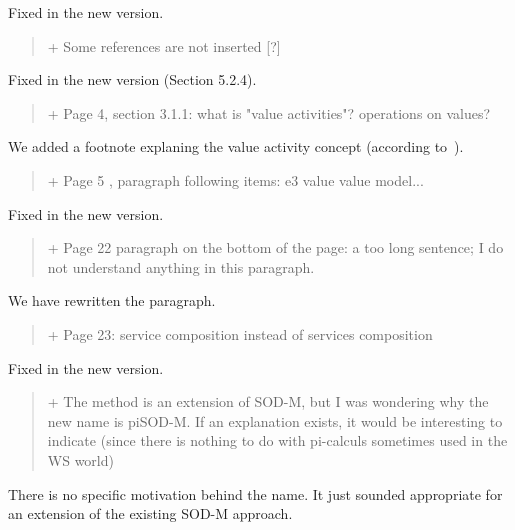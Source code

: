 \documentclass[12pt,a4wide]{article}
\begin{document}
\noindent 
Fixed in the new version.


\begin{quotation}\sf\footnotesize

+ Some references are not inserted [?] 
\end{quotation}

\noindent 
Fixed in the new version (Section 5.2.4).

\begin{quotation}\sf\footnotesize

+ Page 4, section 3.1.1: what is "value activities"? operations on values? 
\end{quotation}

\noindent 
We added a footnote explaning the value activity concept (according to~\cite{Gordijn02valuebased}).

\begin{quotation}\sf\footnotesize

+ Page 5 , paragraph following items: e3 value value model... 
\end{quotation}

\noindent 
Fixed in the new version.

\begin{quotation}\sf\footnotesize

+ Page 22 paragraph on the bottom of the page: a too long sentence; I do not understand anything in this paragraph. 
\end{quotation}

\noindent 
We have rewritten the paragraph.

\begin{quotation}\sf\footnotesize

+ Page 23: service composition instead of services composition 
\end{quotation}

\noindent 
Fixed in the new version.


\begin{quotation}\sf\footnotesize

+ The method is an extension of SOD-M, but I was wondering why the new name is piSOD-M. If an explanation exists, it would be interesting to indicate (since there is nothing to do with pi-calculs sometimes used in the WS world) 
\end{quotation}

\noindent 
There is no specific motivation behind the name. 
It just sounded appropriate for an extension of the existing SOD-M approach.
\end{document}
